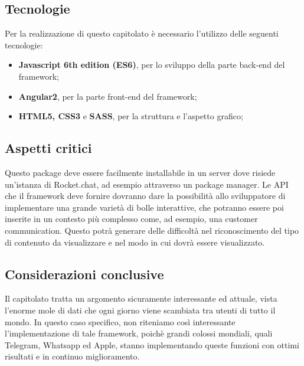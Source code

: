 \subsection{Tecnologie}

Per la realizzazione di questo capitolato è necessario l'utilizzo delle seguenti tecnologie:
\begin{itemize}
	\item \textbf{Javascript 6th edition (ES6)}, per lo sviluppo della parte back-end del framework;
	\item \textbf{Angular2}, per la parte front-end del framework;
	\item \textbf{HTML5, CSS3} e \textbf{SASS}, per la struttura e l'aspetto grafico;
\end{itemize}

\subsection{Aspetti critici}

Questo package deve essere facilmente installabile in un server dove
risiede un'istanza di Rocket.chat, ad esempio attraverso un package
manager. Le API che il framework deve fornire dovranno dare la possibilità
allo sviluppatore di implementare una grande varietà di bolle interattive,
che potranno essere poi inserite in un contesto più complesso come, ad esempio, una customer communication. Questo potrà generare delle difficoltà
nel riconoscimento del tipo di contenuto da visualizzare e nel modo
in cui dovrà essere visualizzato. 

\subsection{Considerazioni conclusive}

Il capitolato tratta un argomento sicuramente interessante ed attuale,
vista l'enorme mole di dati che ogni giorno viene scambiata tra utenti
di tutto il mondo. In questo caso specifico, non riteniamo così interessante
l'implementazione di tale framework, poichè grandi colossi mondiali, quali Telegram, Whatsapp ed Apple, stanno implementando queste funzioni con ottimi risultati e in continuo miglioramento.
